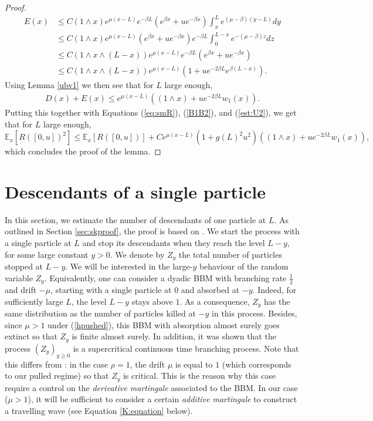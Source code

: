 \documentclass[11pt]{article}
\theoremstyle{plain}
\begin{document}
\begin{proof}
\begin{align*}
E(x)&\leqslant  C(1\wedge x)e^{\mu(x-L)}e^{-\beta L}\left(e^{\beta x}+ue^{-\beta x}\right)\int_x^L e^{(\mu-\beta)(y-L)}dy\\
&\leqslant  C(1\wedge x)e^{\mu(x-L)}\left(e^{\beta x}+ue^{-\beta x}\right)e^{-\beta L}\int_0^{L-x} e^{-(\mu-\beta)z}dz\\
&\leqslant C(1\wedge x\wedge(L-x))e^{\mu(x-L)}e^{-\beta L}\left(e^{\beta x}+ue^{-\beta x}\right)\\
&\leqslant  C(1\wedge x\wedge(L-x))e^{\mu(x-L)}\left(1+ue^{-2\beta L}e^{\beta(L-x)}\right).
\end{align*}
Using Lemma \ref{ubv1} we then see  that for $L$ large enough,
\begin{eqnarray*}
D(x)+E(x)\leqslant e^{\mu(x-L)}((1\wedge x)+ue^{-2\beta L}w_1(x)).
\end{eqnarray*}
Putting this together with Equations (\ref{eq:smR}), (\ref{B1B2}), and (\ref{est:U2}), we get that for $L$ large enough,
\begin{equation*}
\mathbb{E}_x\left[R([0,u])^2\right]\leqslant \mathbb{E}_x\left[R([0,u])\right]+ Ce^{\mu(x-L)}(1+g(L)^2u^2)((1\wedge x)+ue^{-2\beta L}w_1(x)), 
\end{equation*}
which concludes the proof of the lemma.
\end{proof}



\section{Descendants of a single particle} \label{sec:W}
In this section, we estimate the number of descendants of one particle at $L$. As outlined in Section \ref{sec:skproof}, the proof is based on \cite[Section 4]{Berestycki2010}. We start the process with a single particle at $L$ and stop its descendants when they reach the level $L-y$, for some large constant $y>0$. We denote by $Z_y$  the total number of particles stopped at $L-y$. We will be interested in the large-$y$ behaviour of the random variable $Z_y$.
Equivalently, one can consider a dyadic BBM with branching rate $\frac{1}{2}$ and drift $-\mu$, starting with a single particle at $0$ and absorbed at $-y$. Indeed, for sufficiently large $L$, the level $L-y$ stays above $1$. As a consequence, $Z_y$ has the same distribution as the number of particles killed at $-y$ in this process. Besides, since $\mu>1$ under (\ref{hpushed}), this BBM with absorption almost surely goes extinct \cite{KESTEN19789} so that $Z_y$ is finite almost surely. In addition, it was shown \cite{Neveu:1988aa} that the process $(Z_y)_{y\geqslant 0}$ is a supercritical continuous time branching process. Note that this differs from \cite{Berestycki2010}: in the case $\rho=1$,  the drift $\mu$ is equal to $1$ (which corresponds to our pulled regime) so that $Z_y$ is critical. This is the reason why this case require  a control on the \textit{derivative martingale} associated to the BBM. In our case ($\mu>1$), it will be sufficient to consider a certain \textit{additive martingale} to construct a travelling wave (see Equation \eqref{K:equation} below).
\end{document}
